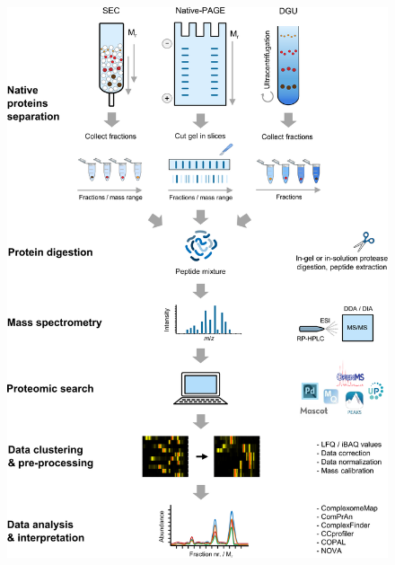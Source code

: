 \begin{figure}[hb!]
    \center
    \includegraphics[width=0.9 \textwidth]{Chapter.1/Figures/Figure5.png} 
    \caption{}
    \label{fig:fig5}
\end{figure}
\addtocounter{figure}{-1}
